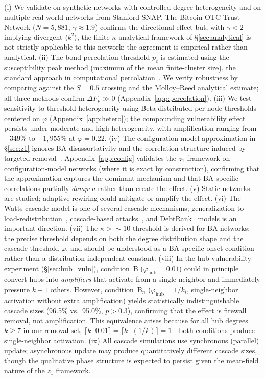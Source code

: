 \documentclass[aps,pre,twocolumn,superscriptaddress,showpacs]{revtex4-2}
\newcommand{\avg}[1]{\langle #1 \rangle}
\newcommand{\pc}{p_c}
\newcommand{\DF}{\Delta F}
\begin{document}
(i) We validate on synthetic networks with controlled degree heterogeneity and on multiple real-world networks from Stanford SNAP. The Bitcoin OTC Trust Network ($N=5{,}881$, $\gamma \approx 1.9$) confirms the directional effect but, with $\gamma < 2$ implying divergent $\avg{k^2}$, the finite-$\kappa$ analytical framework of \S\ref{sec:analytical} is not strictly applicable to this network; the agreement is empirical rather than analytical. (ii) The bond percolation threshold $\pc$ is estimated using the susceptibility peak method (maximum of the mean finite-cluster size), the standard approach in computational percolation~\cite{Newman2001}. We verify robustness by comparing against the $S=0.5$ crossing and the Molloy--Reed analytical estimate; all three methods confirm $\DF_p \gg 0$ (Appendix~\ref{app:percolation}). (iii) We test sensitivity to threshold heterogeneity using Beta-distributed per-node thresholds centered on $\varphi$ (Appendix~\ref{app:hetero}); the compounding vulnerability effect persists under moderate and high heterogeneity, with amplification ranging from $+349\%$ to $+1{,}955\%$ at $\varphi=0.22$. (iv) The configuration-model approximation in \S\ref{sec:z1} ignores BA disassortativity and the correlation structure induced by targeted removal~\cite{Payne2009}. Appendix~\ref{app:config} validates the $z_1$ framework on configuration-model networks (where it is exact by construction), confirming that the approximation captures the dominant mechanism and that BA-specific correlations partially \emph{dampen} rather than create the effect. (v) Static networks are studied; adaptive rewiring could mitigate or amplify the effect. (vi) The Watts cascade model is one of several cascade mechanisms; generalization to load-redistribution~\cite{Motter2004}, cascade-based attacks~\cite{Motter2002}, and DebtRank~\cite{Battiston2012} models is an important direction. (vii) The $\kappa > {\sim}10$ threshold is derived for BA networks; the precise threshold depends on both the degree distribution shape and the cascade threshold $\varphi$, and should be understood as a BA-specific onset condition rather than a distribution-independent constant. (viii) In the hub vulnerability experiment (\S\ref{sec:hub_vuln}), condition~B ($\varphi_{\mathrm{hub}}=0.01$) could in principle convert hubs into \emph{amplifiers} that activate from a single neighbor and immediately pressure $k-1$ others. However, condition~B$_n$ ($\varphi_{\mathrm{hub}}=1/k_i$, single-neighbor activation without extra amplification) yields statistically indistinguishable cascade sizes (96.5\% vs.\ 95.0\%, $p>0.3$), confirming that the effect is firewall removal, not amplification. This equivalence arises because for all hub degrees $k \geq 7$ in our removal set, $\lceil k \cdot 0.01 \rceil = \lceil k \cdot (1/k) \rceil = 1$---both conditions produce single-neighbor activation. (ix) All cascade simulations use synchronous (parallel) update; asynchronous update may produce quantitatively different cascade sizes, though the qualitative phase structure is expected to persist given the mean-field nature of the $z_1$ framework.
\end{document}
